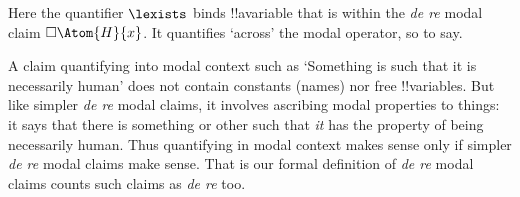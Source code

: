 \documentclass[../../../include/open-logic-section]{subfiles}
\begin{document}
Here the quantifier $\lexists$ binds !!a{variable} that is within 
the \emph{de re} modal claim $\Box\Atom{H}{x}$. It quantifies `across'
the modal operator, so to say. 

A claim quantifying into modal context such as `Something is such that
it is necessarily human' does not contain constants (names) nor free
!!{variable}s. But like simpler \emph{de re} modal claims, it involves
ascribing modal properties to things: it says that there is something
or other such that \emph{it} has the property of being necessarily
human. Thus quantifying in modal context makes sense only if simpler
\emph{de re} modal claims make sense. That is our formal definition
of \emph{de re} modal claims counts such claims as \emph{de re} too.
\end{document}
